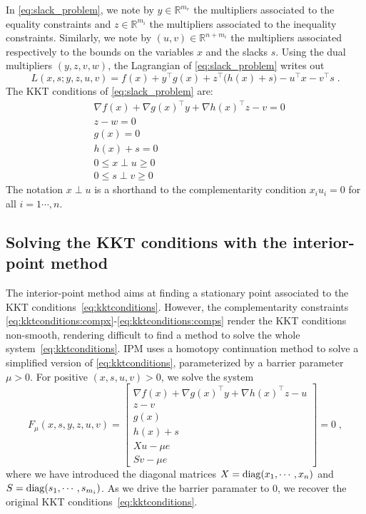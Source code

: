 In \eqref{eq:slack_problem},
we note by $y \in \mathbb{R}^{m_e}$ the multipliers associated
to the equality constraints and $z \in \mathbb{R}^{m_i}$ the multipliers
associated to the inequality constraints. Similarly, we note
by $(u, v) \in \mathbb{R}^{n + m_i}$ the multipliers associated
respectively to the bounds on the variables $x$ and the slacks $s$.
Using the dual multipliers $(y, z, v, w)$,
the Lagrangian of \eqref{eq:slack_problem} writes out
\begin{equation}
  \label{eq:lagrangian}
  L(x, s; y, z, u, v) = f(x) + y^\top g(x) + z^\top \big(h(x) +s\big)
  - u^\top x - v^\top s \; .
\end{equation}
The KKT conditions of \eqref{eq:slack_problem} are:
\begin{subequations}
  \label{eq:kktconditions}
    \begin{align}
      & \nabla f(x) + \nabla g(x)^\top y + \nabla h(x)^\top z - v = 0 \\
      & z - w = 0 \\
      & g(x) = 0 \\
      & h(x) + s = 0 \\
      \label{eq:kktconditions:compx}
      & 0 \leq x \perp u \geq 0 \\
      \label{eq:kktconditions:comps}
      & 0 \leq s \perp v \geq 0
    \end{align}
\end{subequations}
The notation $x \perp u$ is a shorthand to the complementarity
condition $x_i u_i = 0$ for all $i=1\cdots, n$.

\subsection{Solving the KKT conditions with the interior-point method}
\label{sec:ipm:kkt}
The interior-point method aims at finding a stationary point
associated to the KKT conditions~\eqref{eq:kktconditions}. However,
the complementarity constraints \eqref{eq:kktconditions:compx}-\eqref{eq:kktconditions:comps}
render the KKT conditions non-smooth, rendering difficult to find a method
to solve the whole system~\eqref{eq:kktconditions}.
IPM uses a homotopy continuation method to solve a simplified
version of \eqref{eq:kktconditions}, parameterized by a barrier
parameter $\mu > 0$. For positive $(x, s, u, v) > 0$, we solve the system
\begin{equation}
  \label{eq:kkt_ipm}
  F_\mu(x, s, y, z, u, v) =
  \begin{bmatrix}
       \nabla f(x) + \nabla g(x)^\top y + \nabla h(x)^\top z - u  \\
       z - v  \\
       g(x)  \\
       h(x) + s  \\
       X u - \mu e  \\
       S v - \mu e
  \end{bmatrix}
  = 0 \; ,
\end{equation}
where we have introduced the diagonal matrices $X = \operatorname{diag}(x_1, \cdots, x_n)$
and $S = \operatorname{diag}(s_1, \cdots, s_{m_i})$.
As we drive the barrier paramater to $0$, we recover the original
KKT conditions~\eqref{eq:kktconditions}.


